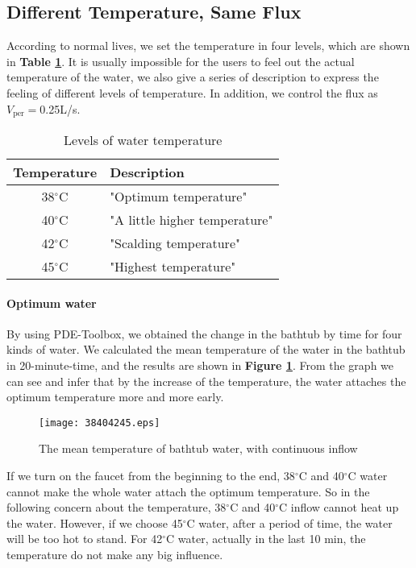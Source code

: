 \documentclass[12pt]{article}
\begin{document}
\subsection{Different Temperature, Same Flux}
According to normal lives, we set the temperature in four levels, which are shown in \textbf{Table
\ref{show}}. It is usually impossible for the users to feel out the actual temperature of the water,
we also give a series of description to express the feeling of different levels of temperature. In
addition, we control the flux as $V_\mathrm{per}=$0.25L/s.
\begin{table}[!htbp]
\begin{center}
\caption{Levels of water temperature}
\begin{tabular}{cl}
    \toprule
    Temperature&Description\\
    \midrule
    38$^\circ$C&"Optimum temperature"\\
    40$^\circ$C&"A little higher temperature"\\
    42$^\circ$C&"Scalding temperature"\\
    45$^\circ$C&"Highest temperature"\\
    \bottomrule
\end{tabular}\label{show}
\end{center}
\end{table}

\paragraph{Optimum water}
By using PDE-Toolbox, we obtained the change in the bathtub by time for four kinds of water. We
calculated the mean temperature of the water in the bathtub in 20-minute-time, and the results are
shown in \textbf{Figure \ref{34}}. From the graph we can see and infer that by the increase of the
temperature, the water attaches the optimum temperature more and more early.
\begin{figure}[!htbp]
\small
\centering
\texttt{[image: 38404245.eps]}
\caption{The mean temperature of bathtub water, with continuous inflow}\label{34}
\end{figure}

If we turn on the faucet from the beginning to the end, 38$^\circ$C and 40$^\circ$C water cannot
make the whole water attach the optimum temperature. So in the following concern about the
temperature, 38$^\circ$C and 40$^\circ$C inflow cannot heat up the water. However, if we choose
45$^\circ$C water, after a period of time, the water will be too hot to stand. For 42$^\circ$C
water, actually in the last 10 min, the temperature do not make any big influence.
\end{document}

